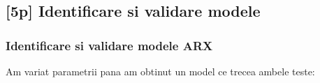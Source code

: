 \documentclass[12pt,english]{article}
\begin{document}
\subsection {[5p] Identificare si validare modele }
\subsubsection {Identificare si validare modele ARX}
Am variat parametrii pana am obtinut un model ce trecea ambele teste:
\begin{center}
\end{center}
\begin{center}
\end{center}
\begin{center}
\end{center}
\end{document}
